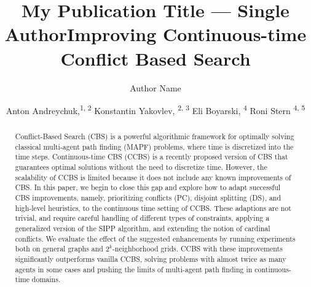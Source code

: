 \documentclass[letterpaper]{article} %
\title{My Publication Title --- Single Author}
\author {
    Author Name \\
}
\title{Improving Continuous-time Conflict Based Search}
\author {

        Anton Andreychuk,\textsuperscript{\rm 1, 2}
        Konstantin Yakovlev, \textsuperscript{\rm 2, 3}
        Eli Boyarski, \textsuperscript{\rm 4}
        Roni Stern \textsuperscript{\rm 4, 5}\\
}
\newcommand\roni[1]{\nb{\textbf{Roni:}}{orange}{#1}}
\begin{document}
\maketitle


\begin{abstract}
Conflict-Based Search (CBS) is a powerful algorithmic framework for optimally solving classical multi-agent path finding (MAPF) problems, where time is discretized into the time steps.
Continuous-time CBS (CCBS) is a recently proposed version of CBS that guarantees optimal solutions without the need to discretize time.
However, the  scalability of CCBS is limited because it does not include any known improvements of CBS.
In this paper, we begin to close this gap and explore how to adapt successful CBS improvements, namely, prioritizing conflicts (PC), disjoint splitting (DS), and high-level heuristics, to the continuous time setting of CCBS.
These adaptions are not trivial, and require careful handling of different types of constraints, applying a generalized version of the \acf{SIPP} algorithm, and extending the notion of cardinal conflicts.
We evaluate the effect of the suggested enhancements by running experiments both on general graphs and $2^k$-neighborhood grids.
CCBS with these improvements significantly outperforms vanilla CCBS,
solving problems with almost twice as many agents in some cases and
pushing the limits of multi-agent path finding in continuous-time domains.




\end{abstract}
\end{document}
